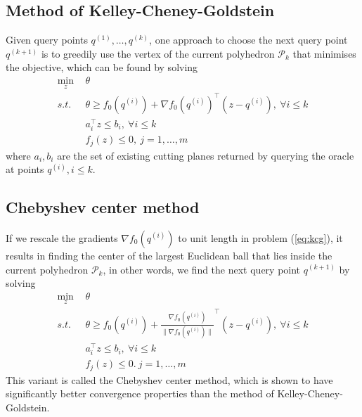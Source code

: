 \documentclass[9pt]{extarticle}
\newcommand{\eat}[1]{}
\begin{document}
\subsection{Method of Kelley-Cheney-Goldstein}
Given query points $q^{(1)}, \dots, q^{(k)}$, 
one approach to choose the next query point $q^{(k+1)}$ is to greedily use the vertex of the current polyhedron $\mathcal{P}_k$ 
that minimises the objective, which can be found by solving 
\begin{equation}
\label{eq:kcg}
\begin{aligned}
\min_{z} ~& \theta  \\
s.t.~~   ~& \theta \ge f_0(q^{(i)}) + \nabla f_0(q^{(i)})^\top (z - q^{(i)}),~ \forall i \le k \\
          & a_i^\top z \le b_i,~ \forall i \le k \\
          & f_j(z) \le 0,~ j = 1, \dots, m
\end{aligned}
\end{equation}
where $a_i, b_i$ are the set of existing cutting planes returned by querying the oracle at points $q^{(i)}, i \le k$.


\subsection{Chebyshev center method}
If we rescale the gradients $\nabla f_0(q^{(i)})$ to unit length in problem (\ref{eq:kcg}), 
it results in finding the center of the largest Euclidean ball that lies inside the current polyhedron $\mathcal{P}_k$,
in other words, we find the next query point $q^{(k+1)}$ by solving
\begin{equation}
\label{eq:chebyshev}
\begin{aligned}
\min_{z} ~& \theta  \\
s.t.~~   ~& \theta \ge f_0(q^{(i)}) + \frac{\nabla f_0(q^{(i)})}{\|\nabla f_0(q^{(i)})\|} ^\top (z - q^{(i)}),~ \forall i \le k \\
          & a_i^\top z \le b_i,~ \forall i \le k \\
          & f_j(z) \le 0.~ j = 1, \dots, m
\end{aligned}
\end{equation}
This variant is called the Chebyshev center method, which is shown to have significantly better convergence properties than the method of Kelley-Cheney-Goldstein.
\eat{citation}
\end{document}
